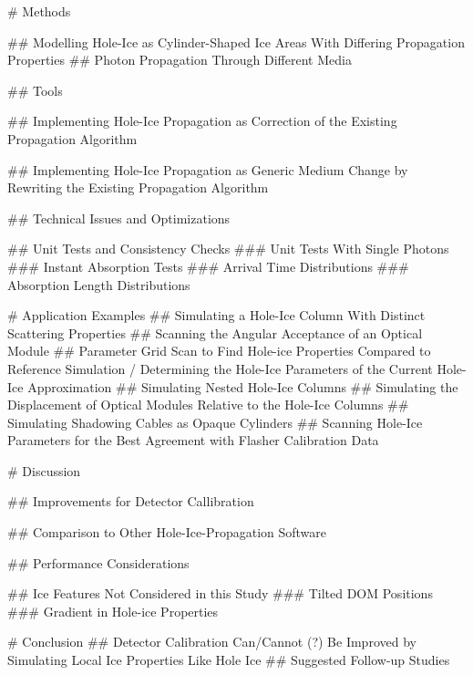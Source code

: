 
# Methods

## Modelling Hole-Ice as Cylinder-Shaped Ice Areas With Differing Propagation Properties
## Photon Propagation Through Different Media

## Tools

## Implementing Hole-Ice Propagation as Correction of the Existing Propagation Algorithm

## Implementing Hole-Ice Propagation as Generic Medium Change by Rewriting the Existing Propagation Algorithm

## Technical Issues and Optimizations

## Unit Tests and Consistency Checks
### Unit Tests With Single Photons
### Instant Absorption Tests
### Arrival Time Distributions
### Absorption Length Distributions

# Application Examples
## Simulating a Hole-Ice Column With Distinct Scattering Properties
## Scanning the Angular Acceptance of an Optical Module
## Parameter Grid Scan to Find Hole-ice Properties Compared to Reference Simulation / Determining the Hole-Ice Parameters of the Current Hole-Ice Approximation
## Simulating Nested Hole-Ice Columns
## Simulating the Displacement of Optical Modules Relative to the Hole-Ice Columns
## Simulating Shadowing Cables as Opaque Cylinders
## Scanning Hole-Ice Parameters for the Best Agreement with Flasher Calibration Data

# Discussion

## Improvements for Detector Callibration

## Comparison to Other Hole-Ice-Propagation Software

## Performance Considerations

## Ice Features Not Considered in this Study
### Tilted DOM Positions
### Gradient in Hole-ice Properties

# Conclusion
## Detector Calibration Can/Cannot (?) Be Improved by Simulating Local Ice Properties Like Hole Ice
## Suggested Follow-up Studies
